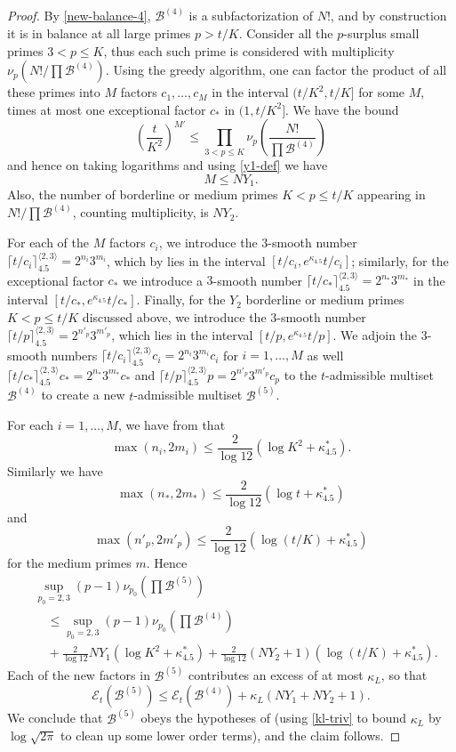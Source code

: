 \documentclass[12pt,a4paper,reqno]{amsart}
\numberwithin{equation}{section}
\theoremstyle{plain}
\theoremstyle{definition}
\newcommand\tuple{{\mathcal B}}
\newcommand\excess{{\mathcal{E}}}
\begin{document}
\begin{proof} By \eqref{new-balance-4}, $\tuple^{(4)}$ is a subfactorization of $N!$, and by construction it is in balance at all large primes $p>t/K$. Consider all the $p$-surplus small primes $3 < p \leq K$, thus each such prime is considered with multiplicity $\nu_p(N!/\prod \tuple^{(4)})$.  
Using the greedy algorithm, one can factor the product of all these primes into $M$ factors $c_1,\dots,c_M$ in the interval $(t/K^2, t/K]$ for some $M$, times at most one exceptional factor $c_*$ in $(1,t/K^2]$.  We have the bound
$$ \left(\frac{t}{K^2}\right)^{M'} \leq
\prod_{3 < p \leq K} \nu_p\left(\frac{N!}{\prod \tuple^{(4)}}\right)$$
and hence on taking logarithms and using \eqref{y1-def} we have
$$
M \leq NY_1. 
$$
Also, the number of borderline or medium primes $K < p \leq t/K$ appearing in $N!/\prod \tuple^{(4)}$, counting multiplicity, is $NY_2$.

For each of the $M$ factors $c_i$, we introduce the $3$-smooth number $\lceil t/c_i\rceil^{\langle 2,3\rangle}_{4.5} = 2^{n_i} 3^{m_i}$, which by  lies in the interval $[t/c_i,e^{\kappa_{4.5}} t/c_i]$; similarly, for the exceptional factor $c_*$ we introduce a $3$-smooth number $\lceil t/c_* \rceil^{\langle 2,3 \rangle}_{4.5} = 2^{n_*} 3^{m_*}$ in the interval $[t/c_*,e^{\kappa_{4.5}} t/c_*]$.  Finally, for the $Y_2$ borderline or medium primes $K < p \leq t/K$ discussed above, we introduce the $3$-smooth number $\lceil t/p\rceil^{\langle 2,3\rangle}_{4.5} = 2^{n'_p} 3^{m'_p}$, which lies in the interval $[t/p,e^{\kappa_{4.5}} t/p]$.  We adjoin the $3$-smooth numbers $\lceil t/c_i\rceil^{\langle 2,3\rangle}_{4.5} c_i = 2^{n_i} 3^{m_i} c_i$ for $i=1,\dots,M$ as well $\lceil t/c_*\rceil^{\langle 2,3\rangle}_{4.5} c_* = 2^{n_*} 3^{m_*} c_*$ and $\lceil t/p \rceil^{\langle 2,3\rangle}_{4.5} p = 2^{n'_p} 3^{m'_p} c_p$ to the $t$-admissible multiset $\tuple^{(4)}$ to create a new $t$-admissible multiset $\tuple^{(5)}$.  

For each $i=1,\dots,M$, we have from  that
$$ \max( n_i, 2m_i ) \leq \frac{2}{\log 12} (\log K^2 + \kappa^*_{4.5}).$$
Similarly we have
$$ \max( n_*, 2m_* ) \leq \frac{2}{\log 12} (\log t + \kappa^*_{4.5})$$
and
$$ \max( n'_p, 2m'_p ) \leq \frac{2}{\log 12} (\log (t/K) + \kappa^*_{4.5})$$
for the medium primes $m$.
Hence
\begin{align*} 
  & \sup_{p_0=2,3} (p-1) \nu_{p_0}\left(\prod \tuple^{(5)}\right) \\
  &\quad \leq \sup_{p_0=2,3} (p-1) \nu_{p_0}\left(\prod \tuple^{(4)}\right)  \\
  &\quad + \frac{2}{\log 12} NY_1 (\log K^2 + \kappa^*_{4.5}) + \frac{2}{\log 12} (NY_2+1) (\log(t/K) + \kappa^*_{4.5}).
\end{align*}
Each of the new factors in $\tuple^{(5)}$ contributes an excess of at most $\kappa_L$, so that
$$ \excess_t(\tuple^{(5)})  \leq \excess_t(\tuple^{(4)}) + \kappa_L (NY_1+NY_2+1).$$
We conclude that $\tuple^{(5)}$ obeys the hypotheses of  (using \eqref{kl-triv} to bound $\kappa_L$ by $\log\sqrt{2\pi}$ to clean up some lower order terms), and the claim follows.
\end{proof}
\end{document}
